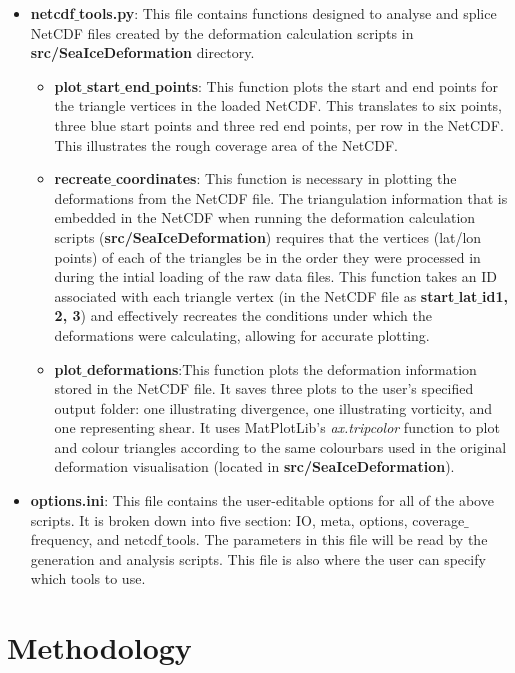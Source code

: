 \documentclass{article}
\begin{document}
\begin{itemize}
            \item \textbf{netcdf$\_$tools.py}: This file contains functions designed to analyse and splice NetCDF files created by the deformation calculation scripts in \textbf{src/SeaIceDeformation} directory.
            \begin{itemize}
                \item \textbf{plot$\_$start$\_$end$\_$points}: This function plots the start and end points for the triangle vertices in the loaded NetCDF. This translates to six points, three blue start points and three red end points, per row in the NetCDF. This illustrates the rough coverage area of the NetCDF.
                \item \textbf{recreate$\_$coordinates}: This function is necessary in plotting the deformations from the NetCDF file. The triangulation information that is embedded in the NetCDF when running the deformation calculation scripts (\textbf{src/SeaIceDeformation}) requires that the vertices (lat/lon points) of each of the triangles be in the order they were processed in during the intial loading of the raw data files. This function takes an ID associated with each triangle vertex (in the NetCDF file as \textbf{start$\_$lat$\_$id1, 2, 3}) and effectively recreates the conditions under which the deformations were calculating, allowing for accurate plotting.
                \item \textbf{plot$\_$deformations}:This function  plots the deformation information stored in the NetCDF file. It saves three plots to the user's specified output folder: one illustrating divergence, one illustrating vorticity, and one representing shear. It uses MatPlotLib's \textit{ax.tripcolor} function to plot and colour triangles according to the same colourbars used in the original deformation visualisation (located in \textbf{src/SeaIceDeformation}).
            \end{itemize}
            \item \textbf{options.ini}: This file contains the user-editable options for all of the above scripts. It is broken down into five section: IO, meta, options, coverage$\_$frequency, and netcdf$\_$tools. The parameters in this file will be read by the generation and analysis scripts. This file is also where the user can specify which tools to use.
        \end{itemize}

\section{Methodology}
\end{document}
